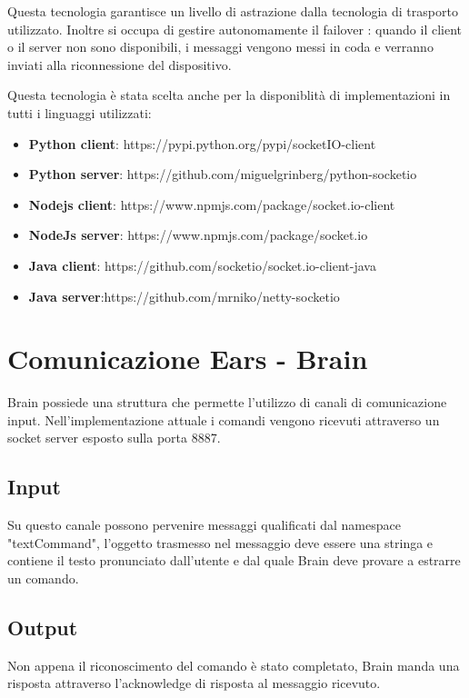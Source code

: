\documentclass[twoside]{supsistudent}
\begin{document}
Questa tecnologia garantisce un livello di astrazione dalla tecnologia di trasporto utilizzato. Inoltre si occupa di gestire autonomamente il failover : quando il client o il server non sono disponibili, i messaggi vengono messi in coda e verranno inviati alla riconnessione del dispositivo.

Questa tecnologia è stata scelta anche per la disponiblità di implementazioni in tutti i linguaggi utilizzati:
\begin{itemize}
	\item \textbf{Python client}: https://pypi.python.org/pypi/socketIO-client
	\item \textbf{Python server}: https://github.com/miguelgrinberg/python-socketio
	\item \textbf{Nodejs client}: https://www.npmjs.com/package/socket.io-client
	\item \textbf{NodeJs server}: https://www.npmjs.com/package/socket.io
	\item \textbf{Java client}: https://github.com/socketio/socket.io-client-java
	\item \textbf{Java server}:https://github.com/mrniko/netty-socketio
\end{itemize}

\chapter{Comunicazione Ears - Brain }
Brain possiede una struttura che permette l'utilizzo di canali di comunicazione input. Nell'implementazione attuale i comandi vengono ricevuti attraverso un socket server esposto sulla porta 8887.
\section{Input}
Su questo canale possono pervenire messaggi qualificati dal namespace "textCommand", l'oggetto trasmesso nel messaggio deve essere una stringa e contiene il testo pronunciato dall'utente e dal quale Brain deve provare a estrarre un comando.
\section{Output}
Non appena il riconoscimento del comando è stato completato, Brain manda una risposta attraverso l'acknowledge di risposta al messaggio ricevuto.
\end{document}

